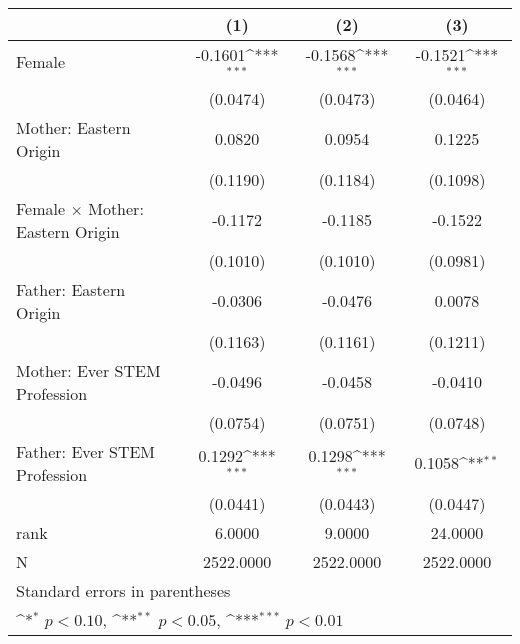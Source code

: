 {
\def\sym#1{\ifmmode^{#1}\else\(^{#1}\)\fi}
\begin{tabular}{l*{3}{c}}
\toprule
                    &\multicolumn{1}{c}{(1)}         &\multicolumn{1}{c}{(2)}         &\multicolumn{1}{c}{(3)}         \\
\midrule
Female              &     -0.1601\sym{***}&     -0.1568\sym{***}&     -0.1521\sym{***}\\
                    &    (0.0474)         &    (0.0473)         &    (0.0464)         \\
\addlinespace
Mother: Eastern Origin&      0.0820         &      0.0954         &      0.1225         \\
                    &    (0.1190)         &    (0.1184)         &    (0.1098)         \\
\addlinespace
Female $\times$ Mother: Eastern Origin&     -0.1172         &     -0.1185         &     -0.1522         \\
                    &    (0.1010)         &    (0.1010)         &    (0.0981)         \\
\addlinespace
Father: Eastern Origin&     -0.0306         &     -0.0476         &      0.0078         \\
                    &    (0.1163)         &    (0.1161)         &    (0.1211)         \\
\addlinespace
Mother: Ever STEM Profession&     -0.0496         &     -0.0458         &     -0.0410         \\
                    &    (0.0754)         &    (0.0751)         &    (0.0748)         \\
\addlinespace
Father: Ever STEM Profession&      0.1292\sym{***}&      0.1298\sym{***}&      0.1058\sym{**} \\
                    &    (0.0441)         &    (0.0443)         &    (0.0447)         \\
\midrule
rank                &      6.0000         &      9.0000         &     24.0000         \\
N                   &   2522.0000         &   2522.0000         &   2522.0000         \\
\bottomrule
\multicolumn{4}{l}{\footnotesize Standard errors in parentheses}\\
\multicolumn{4}{l}{\footnotesize \sym{*} \(p<0.10\), \sym{**} \(p<0.05\), \sym{***} \(p<0.01\)}\\
\end{tabular}
}
